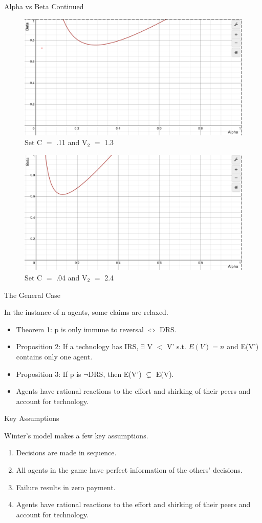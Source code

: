\documentclass{beamer}
\begin{document}
\begin{frame}{Alpha vs Beta Continued}
\begin{figure}
        \includegraphics[width=0.5\linewidth]{Increase in C.png}
        \caption{Set C $=$ .11 and V$_2$ $=$ 1.3} 
    \end{figure}

\begin{figure}
        \includegraphics[width=0.5\linewidth]{increase in V2.png}
        \caption{Set C $=$ .04 and V$_2$ $=$ 2.4} 
    \end{figure}
\end{frame}

\begin{frame}{The General Case}
\item In the instance of n agents, some claims are relaxed.
\begin{itemize}
    \item Theorem 1: p is only immune to reversal $\iff$ DRS.
    \item Proposition 2: If a technology has IRS, $\exists$ V $<$ V' s.t. $E(V) = n$ and E(V') contains only one agent.
    \item Proposition 3: If p is $\neg$DRS, then E(V') $\subsetneq$ E(V).
    \item Agents have rational reactions to the effort and shirking of their peers and account for technology. 
\end{itemize}
\end{frame}

\begin{frame}{Key Assumptions}
\item Winter's model makes a few key assumptions. 
\begin{enumerate}
    \item Decisions are made in sequence.
    \item All agents in the game have perfect information of the others' decisions.
    \item  Failure results in zero payment.
    \item Agents have rational reactions to the effort and shirking of their peers and account for technology. 
\end{enumerate}
\end{frame}
\end{document}
